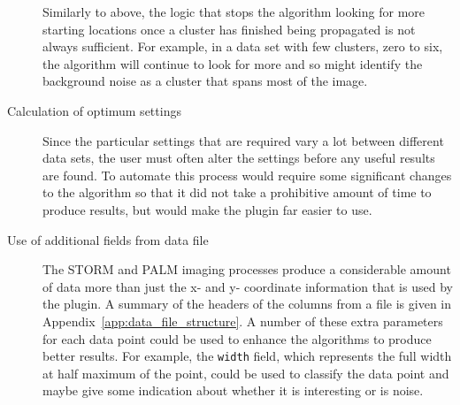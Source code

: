 \begin{description}
		Similarly to above, the logic that stops the algorithm looking for more
		starting locations once a cluster has finished being propagated is not
		always sufficient. For example, in a data set with few clusters, zero
		to six, the algorithm will continue to look for more and so might
		identify the background noise as a cluster that spans most of the
		image.

	\item[Calculation of optimum settings] \hfill

		Since the particular settings that are required vary a lot between
		different data sets, the user must often alter the settings before any
		useful results are found. To automate this process would require some
		significant changes to the algorithm so that it did not take a
		prohibitive amount of time to produce results, but would make the
		plugin far easier to use.

	\item[Use of additional fields from data file] \hfill

		The STORM and PALM imaging processes produce a considerable amount of
		data more than just the x- and y- coordinate information that is used
		by the plugin. A summary of the headers of the columns from a file is
		given in Appendix~\ref{app:data_file_structure}. A number of these
		extra parameters for each data point could be used to enhance the
		algorithms to produce better results. For example, the \texttt{width}
		field, which represents the full width at half maximum of the point,
		could be used to classify the data point and maybe give some indication
		about whether it is interesting or is noise.

\end{description}
